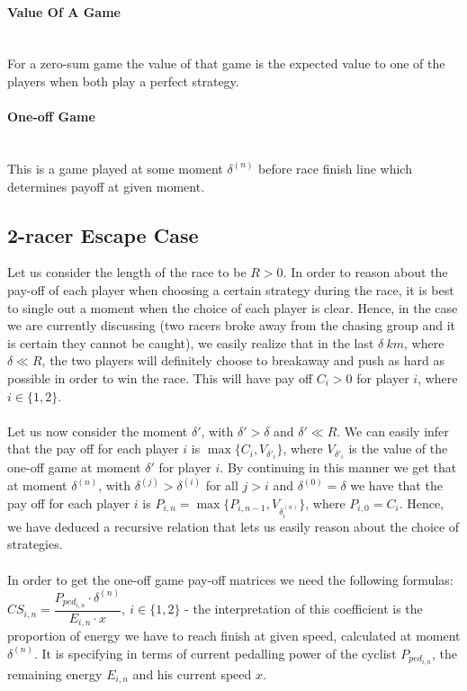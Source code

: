 \documentclass[10pt, a4paper]{report}
\begin{document}
\paragraph{Value Of A Game} ~\\
For a zero-sum game the value of that game is the expected value to one of the players when both play a perfect strategy.

\paragraph{One-off Game} ~\\
This is a game played at some moment $\delta^{(n)}$ before race finish line which determines payoff at given moment.

\subsection{2-racer Escape Case}\label{subsec:zerosumgame}
Let us consider the length of the race to be $R > 0$. In order to reason about the pay-off of each player when choosing a certain strategy during the race, it is best to single out a moment when the choice of each player is clear. Hence, in the case we are currently discussing (two racers broke away from the chasing group and it is certain they cannot be caught), we easily realize that in the last $\delta\ km$, where $\delta\ll R$, the two players will definitely choose to breakaway and push as hard as possible in order to win the race. This will have pay off $C_i>0$ for player $i$, where $i \in \{1,2\}$.
\\\\
Let us now consider the moment $\delta'$, with $\delta'>\delta$ and $\delta'\ll R$. We can easily infer that the pay off for each player $i$ is $\max\{C_i,V_{\delta'_i}\}$, where $V_{\delta'_i}$ is the value of the one-off game at moment $\delta'$ for player $i$. By continuing in this manner we get that at moment $\delta^{(n)}$, with $\delta^{(j)}>\delta^{(i)}$ for all $j>i$ and $\delta^{(0)}=\delta$ we have that the pay off for each player $i$ is $P_{i,n} = \max\{P_{i,n-1},V_{\delta^{(n)}_i}\}$, where $P_{i,0} = C_i$. Hence, we have deduced a recursive relation that lets us easily reason about the choice of strategies.
\\\\
In order to get the one-off game pay-off matrices we need the following formulas:\\
$CS_{i,n} = \dfrac{P_{ped_{i,n}} \cdot \delta^{(n)}}{E_{i,n} \cdot x},\ i\in\{1,2\}$ - the interpretation of this coefficient is the proportion of energy we have to reach finish at given speed, calculated at moment $\delta^{(n)}$. It is specifying in terms of current pedalling power of the cyclist $P_{ped_{i,n}}$, the remaining energy $E_{i,n}$ and his current speed $x$.\\\\
\end{document}
